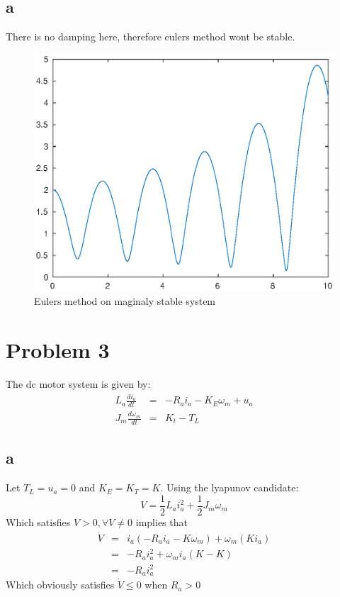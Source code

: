 \documentclass[11pt]{article}
\begin{document}
\subsection*{a}
There is no damping here, therefore eulers method wont be stable.
\begin{figure}[H]
\centering
\includegraphics[width=.8\textwidth]{2a.eps}
\caption{Eulers method on maginaly stable system}
\end{figure}



\section*{Problem 3}
The dc motor system is given by:
\begin{eqnarray*}
L_a \frac{d i_a}{dt} &=& -R_a i_a - K_E \omega_m + u_a \\
J_m \frac{d \omega_m}{dt} &=& K_t - T_L
\end{eqnarray*}
\subsection*{a}
Let $T_L = u_a = 0$ and $K_E = K_T = K$. Using the lyapunov candidate:
\[V = \frac{1}{2} L_a i_a^2 + \frac{1}{2} J_m \omega_m\]
Which satisfies $V > 0, \forall V \not = 0$ implies that
\begin{eqnarray*}
\dot{V} &=& i_a(-R_a i_a - K \omega_m) + \omega_m(K i_a) \\
&=& -R_a i_a^2 + \omega_m i_a (K - K) \\
&=& -R_a i_a^2
\end{eqnarray*}
Which obviously satisfies $\dot{V} \leq 0$ when $R_a > 0$
\end{document}
